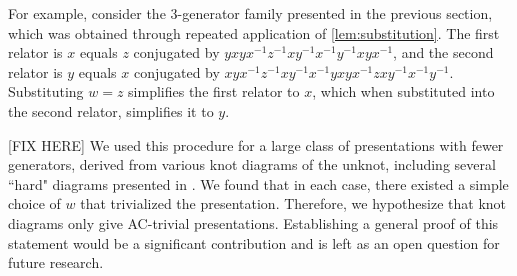 For example, consider the 3-generator family presented in the previous section, which was obtained through repeated application of \autoref{lem:substitution}. The first relator is $x$ equals $z$ conjugated by  $yxyx^{-1}z^{-1}xy^{-1}x^{-1}y^{-1}xyx^{-1}$, and the second relator is $y$ equals $x$ conjugated by $xyx^{-1}z^{-1}xy^{-1}x^{-1}yxyx^{-1}zxy^{-1}x^{-1}y^{-1}$. Substituting $w=z$ simplifies the first relator to $x$, which when substituted into the second relator, simplifies it to $y$. 

[FIX HERE] We used this procedure for a large class of presentations with fewer generators, derived from various knot diagrams of the unknot, including several ``hard" diagrams presented in \cite{burton2024hard}. We found that in each case, there existed a simple choice of $w$ that trivialized the presentation. Therefore, we hypothesize that knot diagrams only give AC-trivial presentations. Establishing a general proof of this statement would be a significant contribution and is left as an open question for future research.




